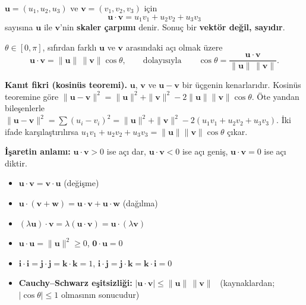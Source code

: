 \begin{tanim}
$\mathbf u=(u_1,u_2,u_3)$ ve $\mathbf v=(v_1,v_2,v_3)$ için
\[
\mathbf u\cdot\mathbf v=u_1v_1+u_2v_2+u_3v_3
\]
sayısına $\mathbf u$ ile $\mathbf v$'nin \textbf{skaler çarpımı} denir. Sonuç bir \textbf{vektör değil, sayıdır}.
\end{tanim}

\begin{teorem}
$\theta\in[0,\pi]$, sıfırdan farklı $\mathbf u$ ve $\mathbf v$ arasındaki açı olmak üzere
\[
\mathbf u\cdot\mathbf v=\|\mathbf u\|\,\|\mathbf v\|\cos\theta,
\qquad\text{dolayısıyla}\qquad
\cos\theta=\frac{\mathbf u\cdot\mathbf v}{\|\mathbf u\|\,\|\mathbf v\|}.
\]
\end{teorem}

\textbf{Kanıt fikri (kosinüs teoremi).} $\mathbf u$, $\mathbf v$ ve $\mathbf u-\mathbf v$ bir üçgenin kenarlarıdır. Kosinüs teoremine göre
$\|\mathbf u-\mathbf v\|^2=\|\mathbf u\|^2+\|\mathbf v\|^2-2\|\mathbf u\|\|\mathbf v\|\cos\theta$. Öte yandan bileşenlerle
$\|\mathbf u-\mathbf v\|^2=\sum(u_i-v_i)^2=\|\mathbf u\|^2+\|\mathbf v\|^2-2(u_1v_1+u_2v_2+u_3v_3)$. İki ifade karşılaştırılırsa $u_1v_1+u_2v_2+u_3v_3=\|\mathbf u\|\|\mathbf v\|\cos\theta$ çıkar.

\textbf{İşaretin anlamı:} $\mathbf u\cdot\mathbf v>0$ ise açı dar, $\mathbf u\cdot\mathbf v<0$ ise açı geniş, $\mathbf u\cdot\mathbf v=0$ ise açı diktir.

\begin{teorem}
\begin{itemize}
\item $\mathbf u\cdot\mathbf v=\mathbf v\cdot\mathbf u$ \quad (değişme)
\item $\mathbf u\cdot(\mathbf v+\mathbf w)=\mathbf u\cdot\mathbf v+\mathbf u\cdot\mathbf w$ \quad (dağılma)
\item $(\lambda\mathbf u)\cdot\mathbf v=\lambda(\mathbf u\cdot\mathbf v)=\mathbf u\cdot(\lambda\mathbf v)$
\item $\mathbf u\cdot\mathbf u=\|\mathbf u\|^2\ge0$, \quad $\mathbf 0\cdot\mathbf u=0$
\item $\mathbf i\cdot\mathbf i=\mathbf j\cdot\mathbf j=\mathbf k\cdot\mathbf k=1$, \quad $\mathbf i\cdot\mathbf j=\mathbf j\cdot\mathbf k=\mathbf k\cdot\mathbf i=0$
\item \textbf{Cauchy--Schwarz eşitsizliği:} $|\mathbf u\cdot\mathbf v|\le\|\mathbf u\|\,\|\mathbf v\|$ \ (kaynaklardan; $|\cos\theta|\le1$ olmasının sonucudur)
\end{itemize}
\end{teorem}

